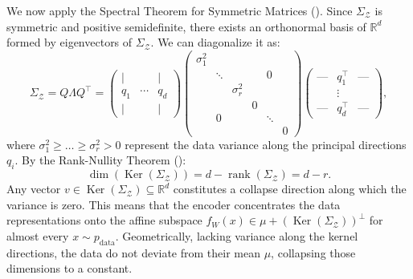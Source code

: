\documentclass[11pt, oneside, openany]{book}
\DeclareMathOperator{\rank}{rank}
\DeclareMathOperator{\Ker}{Ker}
\begin{document}
We now apply the Spectral Theorem for Symmetric Matrices (). Since $\Sigma_{\mathcal{Z}}$ is symmetric and positive semidefinite, there exists an orthonormal basis of $\mathbb{R}^{d}$ formed by eigenvectors of $\Sigma_{\mathcal{Z}}$. We can diagonalize it as:
\begin{equation}
\label{eq:3.13}
\Sigma_{\mathcal{Z}} = Q \Lambda Q^{\top} = 
\begin{pmatrix}
\vert & & \vert \\
q_{1} & \cdots & q_{d} \\
\vert & & \vert
\end{pmatrix}
\begin{pmatrix}
\sigma_{1}^{2} & & & & & \\
& \ddots & & & 0 & \\
& & \sigma_{r}^{2} & & & \\
& & & 0 & & \\
& 0 & & & \ddots & \\
& & & & & 0
\end{pmatrix}
\begin{pmatrix}
\text{---} & q_{1}^{\top} & \text{---} \\
& \vdots & \\
\text{---} & q_{d}^{\top} & \text{---}
\end{pmatrix},
\end{equation}
where $\sigma_{1}^{2} \geq \dots \geq \sigma_{r}^{2} > 0$ represent the data variance along the principal directions $q_{i}$. By the Rank-Nullity Theorem ():
\begin{equation}
\label{eq:3.14}
\dim(\Ker(\Sigma_{\mathcal{Z}})) = d - \rank(\Sigma_{\mathcal{Z}}) = d - r.
\end{equation}
Any vector $v \in \Ker(\Sigma_{\mathcal{Z}}) \subseteq \mathbb{R}^{d}$ constitutes a collapse direction along which the variance is zero. This means that the encoder concentrates the data representations onto the affine subspace $f_{W}(x) \in \mu + (\Ker(\Sigma_{\mathcal{Z}}))^{\perp}$ for almost every $x \sim p_{\text{data}}$. Geometrically, lacking variance along the kernel directions, the data do not deviate from their mean $\mu$, collapsing those dimensions to a constant.
\end{document}
